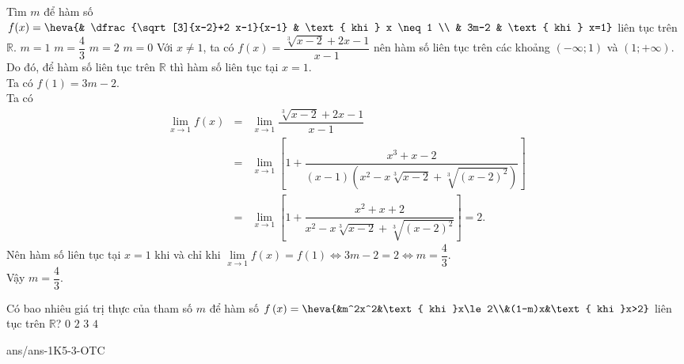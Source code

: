 \begin{ex}%
	Tìm $m$ để hàm số $f(x)=\heva{& \dfrac{\sqrt[3]{x-2}+2 x-1}{x-1} & \text { khi } x \neq 1 \\ & 3m-2 & \text { khi } x=1}$ liên tục trên $\mathbb{R}$.
	\choice
	{$m=1$}
	{\True $m=\dfrac{4}{3}$}
	{$m=2$}
	{$m=0$}
	\loigiai
	{
		Với $x\neq 1$, ta có $f(x)=\dfrac{\sqrt[3]{x-2}+2 x-1}{x-1}$ nên hàm số liên tục trên các khoảng $(-\infty;1)$ và $(1;+\infty)$.\\
		Do đó, để hàm số liên tục trên $\mathbb{R}$ thì hàm số liên tục tại $x=1$.\\
		Ta có $f(1)=3 m-2$.\\
		Ta có 
		\allowdisplaybreaks
		\begin{eqnarray*}
			\lim\limits_{x \rightarrow 1} f(x)
			& = & \lim\limits_{x \rightarrow 1} \dfrac{\sqrt[3]{x-2}+2 x-1}{x-1} \\
			& = & \lim\limits_{x \rightarrow 1}\left[1+\dfrac{x^{3}+x-2}{(x-1)\left(x^{2}-x \sqrt[3]{x-2}+\sqrt[3]{(x-2)^{2}}\right)}\right]\\
			& = & \lim\limits_{x \rightarrow 1}\left[1+\dfrac{x^{2}+x+2}{x^{2}-x \sqrt[3]{x-2}+\sqrt[3]{(x-2)^{2}}}\right]=2.
		\end{eqnarray*}
		Nên hàm số liên tục tại $x=1$ khi và chỉ khi 
		$\lim\limits_{x \rightarrow 1} f(x)=f(1) \Leftrightarrow 3 m-2=2 \Leftrightarrow m=\dfrac{4}{3}$.\\
		Vậy $m=\dfrac{4}{3}$.
	}
\end{ex}
\begin{ex}%
	Có bao nhiêu giá trị thực của tham số $m$ để hàm số $f\left(x\right)=\heva{&m^2x^2&\text{ khi }x\le 2\\&(1-m)x&\text{ khi }x>2}$ liên tục trên $\mathbb{R}$?
	\choice
	{$0$}
	{\True $2$}
	{$3$}
	{$4$}
\end{ex}
\begin{indapan}{10}
	{ans/ans-1K5-3-OTC}
\end{indapan}